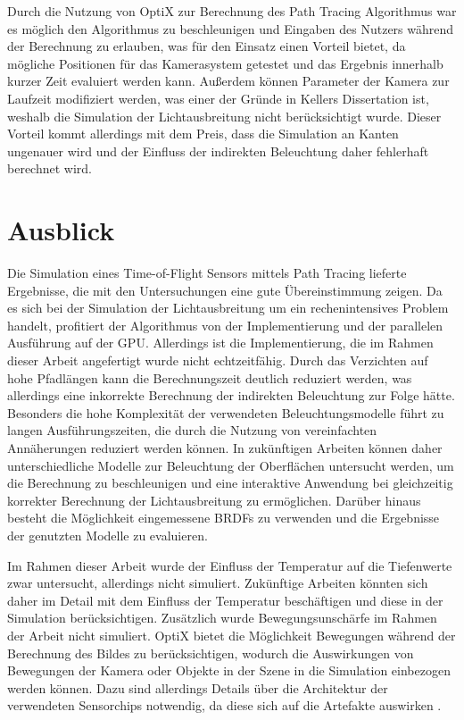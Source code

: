 \documentclass[thesis.tex]{subfiles}
\begin{document}
Durch die Nutzung von OptiX zur Berechnung des Path Tracing Algorithmus war es möglich den Algorithmus zu beschleunigen und Eingaben des Nutzers während der Berechnung zu erlauben, was für den Einsatz einen Vorteil bietet, da mögliche Positionen für das Kamerasystem getestet und das Ergebnis innerhalb kurzer Zeit evaluiert werden kann. Außerdem können Parameter der Kamera zur Laufzeit modifiziert werden, was einer der Gründe in Kellers Dissertation ist, weshalb die Simulation der Lichtausbreitung nicht berücksichtigt wurde. Dieser Vorteil kommt allerdings mit dem Preis, dass die Simulation an Kanten ungenauer wird und der Einfluss der indirekten Beleuchtung daher fehlerhaft berechnet wird.

\section{Ausblick}

Die Simulation eines Time-of-Flight Sensors mittels Path Tracing lieferte Ergebnisse, die mit den Untersuchungen eine gute Übereinstimmung zeigen. Da es sich bei der Simulation der Lichtausbreitung um ein rechenintensives Problem handelt, profitiert der Algorithmus von der Implementierung und der parallelen Ausführung auf der GPU. Allerdings ist die Implementierung, die im Rahmen dieser Arbeit angefertigt wurde nicht echtzeitfähig. Durch das Verzichten auf hohe Pfadlängen kann die Berechnungszeit deutlich reduziert werden, was allerdings eine inkorrekte Berechnung der indirekten Beleuchtung zur Folge hätte. Besonders die hohe Komplexität der verwendeten Beleuchtungsmodelle führt zu langen Ausführungszeiten, die durch die Nutzung von vereinfachten Annäherungen reduziert werden können. In zukünftigen Arbeiten können daher unterschiedliche Modelle zur Beleuchtung der Oberflächen untersucht werden, um die Berechnung zu beschleunigen und eine interaktive Anwendung bei gleichzeitig korrekter Berechnung der Lichtausbreitung zu ermöglichen. Darüber hinaus besteht die Möglichkeit eingemessene BRDFs zu verwenden und die Ergebnisse der genutzten Modelle zu evaluieren.

Im Rahmen dieser Arbeit wurde der Einfluss der Temperatur auf die Tiefenwerte zwar untersucht, allerdings nicht simuliert. Zukünftige Arbeiten könnten sich daher im Detail mit dem Einfluss der Temperatur beschäftigen und diese in der Simulation berücksichtigen. Zusätzlich wurde Bewegungsunschärfe im Rahmen der Arbeit nicht simuliert. OptiX bietet die Möglichkeit Bewegungen während der Berechnung des Bildes zu berücksichtigen, wodurch die Auswirkungen von Bewegungen der Kamera oder Objekte in der Szene in die Simulation einbezogen werden können. Dazu sind allerdings Details über die Architektur der verwendeten Sensorchips notwendig, da diese sich auf die Artefakte auswirken \cite{bib:Lambers2015}.
\end{document}
